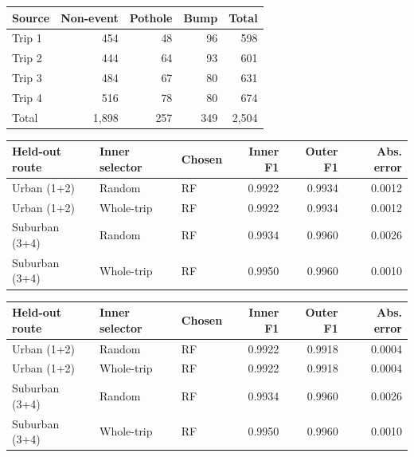 \par\medskip
\begin{singlespace}\small
\noindent\begin{minipage}{\linewidth}
\centering
{}
\begin{tabularx}{\linewidth}{Xrrrr}\toprule
Source & Non-event & Pothole & Bump & Total\\\midrule
Trip 1 &454&48&96&598\\
Trip 2 &444&64&93&601\\
Trip 3 &484&67&80&631\\
Trip 4 &516&78&80&674\\\midrule
Total &1,898&257&349&2,504\\\bottomrule
\end{tabularx}
\end{minipage}
\end{singlespace}
\par\medskip
\par\medskip
\begin{singlespace}\small
\noindent\begin{minipage}{\linewidth}
\centering
{}
\begin{tabularx}{\linewidth}{lXlrrr}
\toprule
Held-out route & Inner selector & Chosen & Inner F1 & Outer F1 & Abs. error \\
\midrule
Urban (1+2) & Random & RF & 0.9922 & 0.9934 & 0.0012 \\
Urban (1+2) & Whole-trip & RF & 0.9922 & 0.9934 & 0.0012 \\
\midrule
Suburban (3+4) & Random & RF & 0.9934 & 0.9960 & 0.0026 \\
Suburban (3+4) & Whole-trip & RF & 0.9950 & 0.9960 & 0.0010 \\
\bottomrule\end{tabularx}
\end{minipage}
\end{singlespace}
\par\medskip
\par\medskip
\begin{singlespace}\small
\noindent\begin{minipage}{\linewidth}
\centering
{}
\begin{tabularx}{\linewidth}{lXlrrr}
\toprule
Held-out route & Inner selector & Chosen & Inner F1 & Outer F1 & Abs. error \\
\midrule
Urban (1+2) & Random & RF & 0.9922 & 0.9918 & 0.0004 \\
Urban (1+2) & Whole-trip & RF & 0.9922 & 0.9918 & 0.0004 \\
\midrule
Suburban (3+4) & Random & RF & 0.9934 & 0.9960 & 0.0026 \\
Suburban (3+4) & Whole-trip & RF & 0.9950 & 0.9960 & 0.0010 \\
\bottomrule\end{tabularx}
\end{minipage}
\end{singlespace}
\par\medskip

